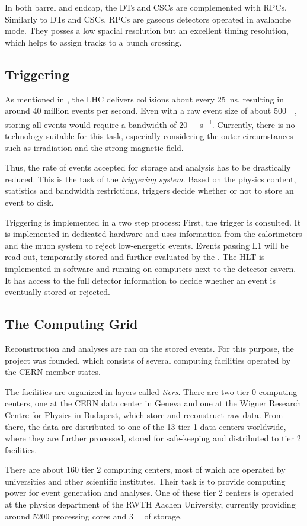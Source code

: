 In both barrel and endcap, the \acp{DT} and \acp{CSC} are complemented with \acp{RPC}. Similarly to \acp{DT} and \acp{CSC}, \acp{RPC} are gaseous detectors operated in avalanche mode. They posses a low spacial resolution but an excellent timing resolution, which helps to assign tracks to a bunch crossing.

\subsection{Triggering}
\label{sec:triggering}
As mentioned in , the \ac{LHC} delivers collisions about every \SI{25}{\nano\second}, resulting in around \num{40} million events per second. Even with a raw event size of about \SI{500}{\kilo\byte}\cite{CMSCollaboration:CMStriggersystem}, storing all events would require a bandwidth of \SI{20}{\tera\byte\per\second}. Currently, there is no technology suitable for this task, especially considering the outer circumstances such as irradiation and the strong magnetic field.

Thus, the rate of events accepted for storage and analysis has to be drastically reduced. This is the task of the \emph{triggering system}. Based on the physics content, statistics and bandwidth restrictions, triggers decide whether or not to store an event to disk.

Triggering is implemented in a two step process: First, the  trigger is consulted. It is implemented in dedicated hardware and uses information from the calorimeters and the muon system to reject low-energetic events. Events passing \ac{L1} will be read out, temporarily stored and further evaluated by the . The \ac{HLT} is implemented in software and running on computers next to the detector cavern. It has access to the full detector information to decide whether an event is eventually stored or rejected\cite{CMSCollaboration:CMStriggersystem}.

\subsection{The Computing Grid}
Reconstruction and analyses are ran on the stored events. For this purpose, the  project was founded, which consists of several computing facilities operated by the \ac{CERN} member states.

The facilities are organized in layers called \emph{tiers}. There are two tier 0 computing centers, one at the \ac{CERN} data center in Geneva and one at the Wigner Research Centre for Physics in Budapest, which store and reconstruct raw data. From there, the data are distributed to one of the 13 tier 1 data centers worldwide, where they are further processed, stored for safe-keeping and distributed to tier 2 facilities.

There are about 160 tier 2 computing centers, most of which are operated by universities and other scientific institutes. Their task is to provide computing power for event generation and analyses\cite{CERN:Gridsystemtiers,WLCG:Tiercentres}. One of these tier 2 centers is operated at the physics department of the RWTH Aachen University, currently providing around \num{5200} processing cores and \SI{3}{\peta\byte} of storage\cite{UniRWTHAachenIII.PhysikalischesInstitut:GridComputing}. 
